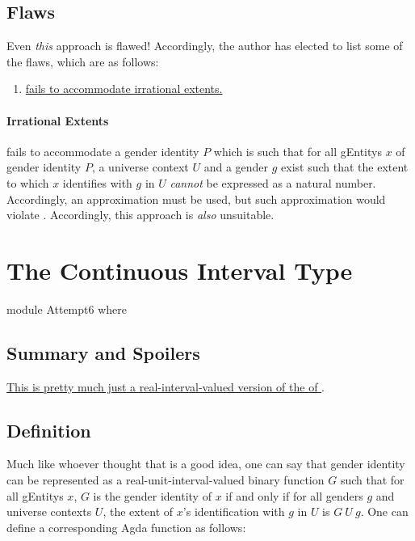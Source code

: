 \documentclass{article}
\theoremstyle{remark}
\newcommand{\summaryLink}[2]{\hyperref[#1]{#2}}
\begin{document}
\subsection{Flaws}\label{sec:gender5flaws}
Even \emph{this} approach is flawed!  Accordingly, the author has elected to list some of the flaws, which are as follows:

\begin{enumerate}
  \item \hyperref[sec:gender5irrational]{ fails to accommodate irrational extents.}\label{enum:gender5flawsIrrational}
\end{enumerate}

\paragraph{Irrational Extents}\label{sec:gender5irrational}
 fails to accommodate a gender identity \(P\) which is such that for all \glspl{gEntity} \(x\) of gender identity \(P\), a universe context \(U\) and a gender \(g\) exist such that the extent to which \(x\) identifies with \(g\) in \(U\) \emph{cannot} be expressed as a natural number.  Accordingly, an approximation must be used, but such approximation would violate .  Accordingly, this approach is \emph{also} unsuitable.

\section{The Continuous Interval Type}

\begin{code}
module Attempt6 where
\end{code}

\subsection{Summary and Spoilers}
\summaryLink{sec:gender6definition}{This \AgdaFunction{AbstractGender} is pretty much just a real-interval-valued version of the \AgdaFunction{AbstractGender} of \fref{sec:gender5}}.

\subsection{Definition}\label{sec:gender6definition}
Much like whoever thought that  is a good idea, one can say that gender identity can be represented as a real-unit-interval-valued binary function \(G\) such that for all \glspl{gEntity} \(x\), \(G\) is the gender identity of \(x\) if and only if for all genders \(g\) and universe contexts \(U\), the extent of \(x\)'s identification with \(g\) in \(U\) is \(G\ U\ g\).  One can define a corresponding Agda function  as follows:
\end{document}
